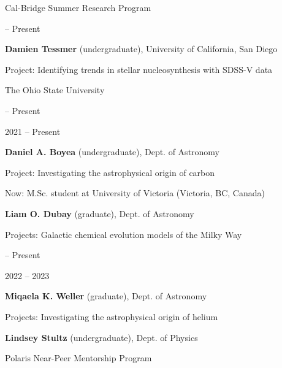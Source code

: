 \documentclass[cv.tex]{subfiles}
\begin{document}
{\color{themecolor} \large Cal-Bridge Summer Research Program}
\par\noindent
\parbox{0.18\textwidth}{%
	 -- Present \par
	\null \par
}
\hspace{1mm}
\parbox{0.8\textwidth}{%
	\vspace{1mm}
	\textbf{Damien Tessmer} (undergraduate), University of California,
	San Diego \par
	Project: Identifying trends in stellar nucleosynthesis with SDSS-V data \par
}

\vspace{5mm}
\noindent
{\color{themecolor} \large The Ohio State University}
\par\noindent
\parbox{0.18\textwidth}{%
	 -- Present \par
	\null \par
	\null \par
	2021 -- Present \par
	\null \par
}
\hspace{1mm}
\parbox{0.8\textwidth}{%
	\vspace{1mm}
	\textbf{Daniel A. Boyea} (undergraduate), Dept. of Astronomy \par
	Project: Investigating the astrophysical origin of carbon \par
	Now: M.Sc. student at University of Victoria (Victoria, BC, Canada) \par
	\textbf{Liam O. Dubay} (graduate), Dept. of Astronomy \par
	Projects: Galactic chemical evolution models of the Milky Way \par
}

\newpage
\noindent
\parbox{0.18\textwidth}{%
	 -- Present \par
	\null \par
	2022 -- 2023 \par
	\null
}
\hspace{1mm}
\parbox{0.8\textwidth}{%
	\vspace{1mm}
	\textbf{Miqaela K. Weller} (graduate), Dept. of Astronomy \par
	Projects: Investigating the astrophysical origin of helium \par
	\textbf{Lindsey Stultz} (undergraduate), Dept. of Physics \par
	Polaris Near-Peer Mentorship Program
}
\end{document}
